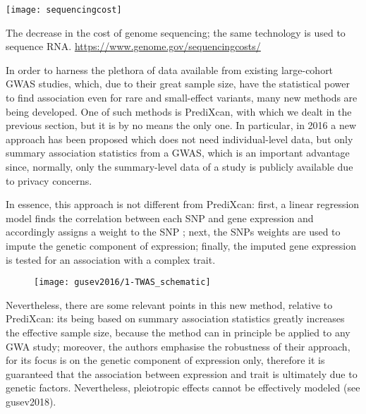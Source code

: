 \documentclass[../main.tex]{subfiles}
\begin{document}
\begin{marginfigure}[-4cm]
	\texttt{[image: sequencingcost]}
	\caption[Sequencing cost over time]{The decrease in the cost of 
	genome sequencing; the same technology is used to sequence RNA. 
	\url{https://www.genome.gov/sequencingcosts/}}
\end{marginfigure}

In order to harness the plethora of data available from existing 
large-cohort GWAS studies, which, due to their great sample size, have 
the statistical power to find association even for rare and small-effect 
variants, many new methods are being developed. One of such methods is 
PrediXcan, with which we dealt in the previous section, but it is by no 
means the only one. In particular, in 2016 a new approach has been 
proposed which does not need individual-level data, but only summary 
association statistics from a GWAS, 
which is an important advantage since, normally, only the summary-level 
data of a study is publicly available due to privacy concerns.

In essence, this approach is not different from PrediXcan: first, a 
linear regression model finds the correlation between each SNP and gene 
expression and accordingly assigns a weight to the SNP ; 
next, the SNPs weights are used to impute the \cis genetic component of 
expression; finally, the imputed gene expression is tested for an 
association  with a complex trait.

\begin{figure}
	\texttt{[image: gusev2016/1-TWAS\_schematic]}
	\caption{}
\end{figure}

Nevertheless, there are some relevant points in this new method, 
relative to PrediXcan: its being based on summary association statistics 
greatly increases the effective sample size, because the method can in 
principle be applied to any GWA study; moreover, the authors emphasise 
the robustness of their approach, for its focus is on the genetic 
component of expression only, therefore it is guaranteed that the 
association between expression and trait is ultimately due to genetic 
factors. Nevertheless, pleiotropic 
effects cannot be effectively modeled (see gusev2018).
\end{document}
